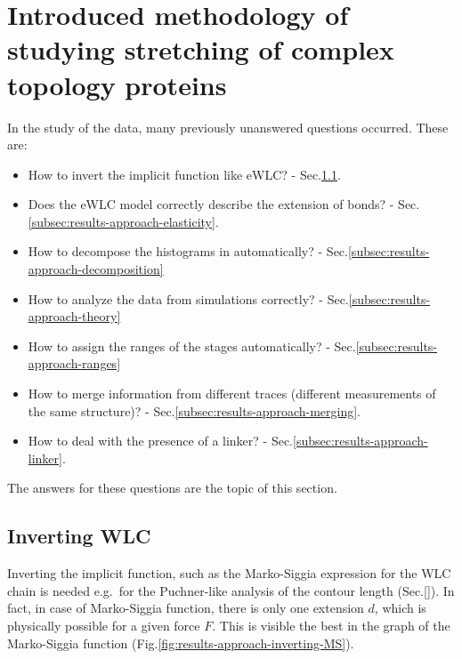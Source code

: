 \section{Introduced methodology of studying stretching of complex topology proteins}
\label{sec:results-approach}
In the study of the data, many previously unanswered questions occurred.
These are:
\begin{itemize}
    \item How to invert the implicit function like eWLC?
    - Sec.\ref{subsec:results-approach-inverting}.
    \item Does the eWLC model correctly describe the extension of bonds?
    - Sec.\ref{subsec:results-approach-elasticity}.
    \item How to decompose the histograms in automatically?
    - Sec.\ref{subsec:results-approach-decomposition}
    \item How to analyze the data from simulations correctly?
    - Sec.\ref{subsec:results-approach-theory}
    \item How to assign the ranges of the stages automatically?
    - Sec.\ref{subsec:results-approach-ranges}
    \item How to merge information from different traces (different measurements of the same structure)?
    - Sec.\ref{subsec:results-approach-merging}.
    \item How to deal with the presence of a linker?
    - Sec.\ref{subsec:results-approach-linker}.
\end{itemize}

The answers for these questions are the topic of this section.

\subsection{Inverting WLC}
\label{subsec:results-approach-inverting}
Inverting the implicit function, such as the Marko-Siggia expression for the WLC chain is needed e.g.\ for the Puchner-like analysis of the contour length (Sec.\ref{}).
In fact, in case of Marko-Siggia function, there is only one extension $d$, which is physically possible for a given force $F$.
This is visible the best in the graph of the Marko-Siggia function (Fig.\ref{fig:results-approach-inverting-MS}).

\setcounter{fignums}{\value{figure}}

